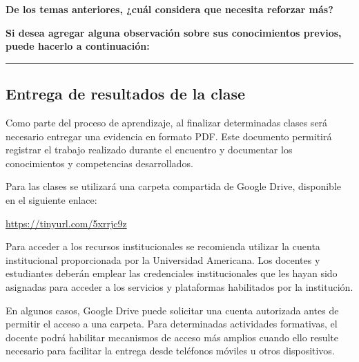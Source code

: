 \documentclass[10pt]{article}
\begin{document}
\normalsize

\vspace{0.5cm}

\noindent
\textbf{De los temas anteriores, ¿cuál considera que necesita reforzar más?}

\vspace{0.3cm}

\begin{center}
\end{center}

\vspace{0.4cm}

\noindent
\textbf{Si desea agregar alguna observación sobre sus conocimientos previos, puede hacerlo a continuación:}

\vspace{1.5cm}

\noindent
\rule{\textwidth}{0.4pt}







\subsection{Entrega de resultados de la clase}

Como parte del proceso de aprendizaje, al finalizar determinadas clases
será necesario entregar una evidencia en formato PDF. Este documento
permitirá registrar el trabajo realizado durante el encuentro y
documentar los conocimientos y competencias desarrollados.

Para las clases se utilizará una carpeta compartida de Google Drive,
disponible en el siguiente enlace:

\begin{center}
\href{https://tinyurl.com/5xrrjc9z}{https://tinyurl.com/5xrrjc9z}
\end{center}

Para acceder a los recursos institucionales se recomienda utilizar la cuenta institucional proporcionada por la Universidad Americana. Los docentes y estudiantes deberán emplear las credenciales institucionales que les hayan sido asignadas para acceder a los servicios y plataformas habilitados por la institución.

En algunos casos, Google Drive puede solicitar una cuenta autorizada antes
de permitir el acceso a una carpeta. Para determinadas actividades
formativas, el docente podrá habilitar mecanismos de acceso más amplios
cuando ello resulte necesario para facilitar la entrega desde teléfonos
móviles u otros dispositivos.
\end{document}

